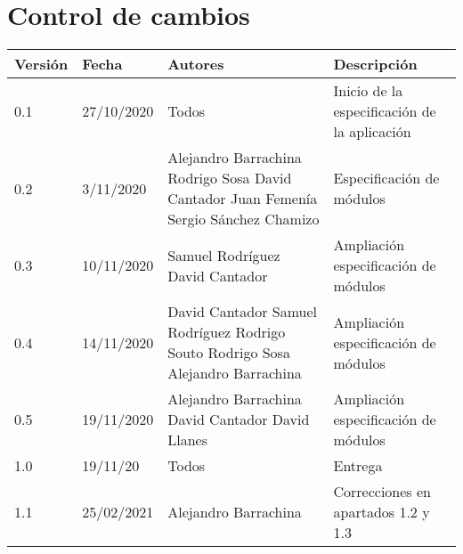 \documentclass[12pt]{article}
\begin{document}
\section*{Control de cambios} %
\noindent\begin{tabularx}{\textwidth}{ |l|l|p{5cm}|X| }
	\hline
	\textbf{Versión} & \textbf{Fecha} & \textbf{Autores}                                                                                                         & \textbf{Descripción}                                 \\
	\hline
	0.1              & 27/10/2020     & Todos                                                                                                                    & Inicio de la especificación de la aplicación         \\
	\hline
	0.2              & 3/11/2020      & Alejandro Barrachina \newline Rodrigo Sosa \newline David Cantador \newline Juan Femenía \newline Sergio Sánchez Chamizo & Especificación de módulos                            \\
	\hline
	0.3              & 10/11/2020     & Samuel Rodríguez \newline David Cantador                                                                                 & Ampliación especificación de módulos                 \\
	\hline
	0.4              & 14/11/2020     & David Cantador \newline Samuel Rodríguez \newline Rodrigo Souto \newline Rodrigo Sosa \newline Alejandro Barrachina      & Ampliación especificación de módulos                 \\
	\hline
	0.5              & 19/11/2020     & Alejandro Barrachina \newline David Cantador \newline David Llanes                                                       & Ampliación especificación de módulos                 \\
	\hline
	1.0              & 19/11/20       & Todos                                                                                                                    & Entrega                                              \\
	\hline
	1.1              & 25/02/2021     & Alejandro Barrachina                                                                                                     & Correcciones en apartados 1.2 y 1.3                  \\

\end{tabularx}
\end{document}
